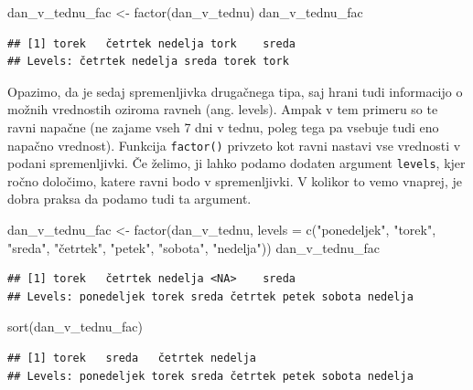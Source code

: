 \documentclass[
]{book}
\newenvironment{Shaded}{\begin{snugshade}}{\end{snugshade}}
\newcommand{\AttributeTok}[1]{\textcolor[rgb]{0.77,0.63,0.00}{#1}}
\newcommand{\FunctionTok}[1]{\textcolor[rgb]{0.00,0.00,0.00}{#1}}
\newcommand{\NormalTok}[1]{#1}
\newcommand{\OtherTok}[1]{\textcolor[rgb]{0.56,0.35,0.01}{#1}}
\newcommand{\StringTok}[1]{\textcolor[rgb]{0.31,0.60,0.02}{#1}}
\begin{document}
\begin{Shaded}
\begin{Highlighting}[]
\NormalTok{dan\_v\_tednu\_fac }\OtherTok{\textless{}{-}} \FunctionTok{factor}\NormalTok{(dan\_v\_tednu)}
\NormalTok{dan\_v\_tednu\_fac}
\end{Highlighting}
\end{Shaded}

\begin{verbatim}
## [1] torek   četrtek nedelja tork    sreda  
## Levels: četrtek nedelja sreda torek tork
\end{verbatim}

Opazimo, da je sedaj spremenljivka drugačnega tipa, saj hrani tudi informacijo o možnih vrednostih oziroma ravneh (ang. levels). Ampak v tem primeru so te ravni napačne (ne zajame vseh 7 dni v tednu, poleg tega pa vsebuje tudi eno napačno vrednost). Funkcija \texttt{factor()} privzeto kot ravni nastavi vse vrednosti v podani spremenljivki. Če želimo, ji lahko podamo dodaten argument \texttt{levels}, kjer ročno določimo, katere ravni bodo v spremenljivki. V kolikor to vemo vnaprej, je dobra praksa da podamo tudi ta argument.

\begin{Shaded}
\begin{Highlighting}[]
\NormalTok{dan\_v\_tednu\_fac }\OtherTok{\textless{}{-}} \FunctionTok{factor}\NormalTok{(dan\_v\_tednu, }\AttributeTok{levels =} \FunctionTok{c}\NormalTok{(}\StringTok{"ponedeljek"}\NormalTok{, }\StringTok{"torek"}\NormalTok{, }\StringTok{"sreda"}\NormalTok{, }\StringTok{"četrtek"}\NormalTok{, }
                                                  \StringTok{"petek"}\NormalTok{, }\StringTok{"sobota"}\NormalTok{, }\StringTok{"nedelja"}\NormalTok{))}
\NormalTok{dan\_v\_tednu\_fac}
\end{Highlighting}
\end{Shaded}

\begin{verbatim}
## [1] torek   četrtek nedelja <NA>    sreda  
## Levels: ponedeljek torek sreda četrtek petek sobota nedelja
\end{verbatim}

\begin{Shaded}
\begin{Highlighting}[]
\FunctionTok{sort}\NormalTok{(dan\_v\_tednu\_fac)}
\end{Highlighting}
\end{Shaded}

\begin{verbatim}
## [1] torek   sreda   četrtek nedelja
## Levels: ponedeljek torek sreda četrtek petek sobota nedelja
\end{verbatim}
\end{document}
